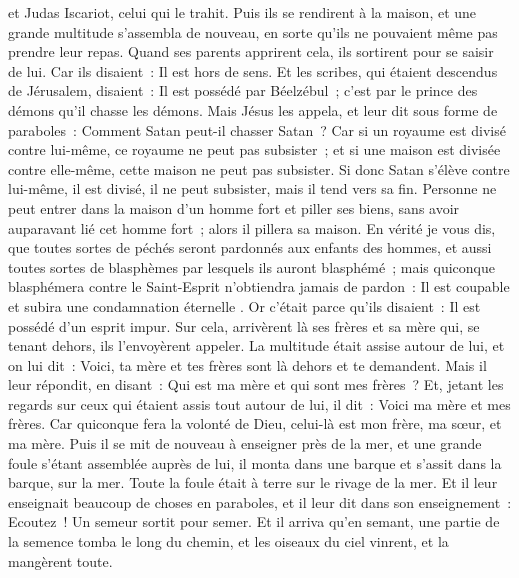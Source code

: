 \begin{multicols}{2}
et Judas Iscariot, celui qui le trahit.
Puis ils se rendirent à la maison, et une grande multitude s'assembla de nouveau, en sorte qu'ils ne pouvaient même pas prendre leur repas.
Quand ses parents apprirent cela, ils sortirent pour se saisir de lui. Car ils disaient~: Il est hors de sens.
Et les scribes, qui étaient descendus de Jérusalem, disaient~: Il est possédé par Béelzébul~; c'est par le prince des démons qu'il chasse les démons.
Mais Jésus les appela, et leur dit sous forme de paraboles~: Comment Satan peut-il chasser Satan~?
Car si un royaume est divisé contre lui-même, ce royaume ne peut pas subsister~;
et si une maison est divisée contre elle-même, cette maison ne peut pas subsister.
Si donc Satan s'élève contre lui-même, il est divisé, il ne peut subsister, mais il tend vers sa fin.
Personne ne peut entrer dans la maison d'un homme fort et piller ses biens, sans avoir auparavant lié cet homme fort~; alors il pillera sa maison.
En vérité je vous dis, que toutes sortes de péchés seront pardonnés aux enfants des hommes, et aussi toutes sortes de blasphèmes par lesquels ils auront blasphémé~;
mais quiconque blasphémera contre le Saint-Esprit n'obtiendra jamais de pardon~: Il est coupable et subira une condamnation éternelle .
Or c'était parce qu'ils disaient~: Il est possédé d'un esprit impur.
Sur cela, arrivèrent là ses frères et sa mère qui, se tenant dehors, ils l'envoyèrent appeler. La multitude était assise autour de lui,
et on lui dit~: Voici, ta mère et tes frères sont là dehors et te demandent.
Mais il leur répondit, en disant~: Qui est ma mère et qui sont mes frères~?
Et, jetant les regards sur ceux qui étaient assis tout autour de lui, il dit~: Voici ma mère et mes frères.
Car quiconque fera la volonté de Dieu, celui-là est mon frère, ma sœur, et ma mère.
\VerseOne{}Puis il se mit de nouveau à enseigner près de la mer, et une grande foule s'étant assemblée auprès de lui, il monta dans une barque et s'assit dans la barque, sur la mer. Toute la foule était à terre sur le rivage de la mer.
Et il leur enseignait beaucoup de choses en paraboles, et il leur dit dans son enseignement~:
Ecoutez~! Un semeur sortit pour semer.
Et il arriva qu'en semant, une partie de la semence tomba le long du chemin, et les oiseaux du ciel vinrent, et la mangèrent toute.

\end{multicols}
